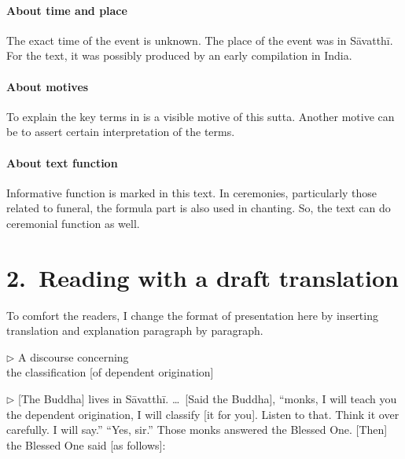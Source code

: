 \paragraph*{About time and place} The exact time of the event is unknown. The place of the event was in S\=avatth\=i. For the text, it was possibly produced by an early compilation in India.

\paragraph*{About motives} To explain the key terms in  is a visible motive of this sutta. Another motive can be to assert certain interpretation of the terms.

\paragraph*{About text function} Informative function is marked in this text. In ceremonies, particularly those related to funeral, the formula part is also used in chanting. So, the text can do ceremonial function as well.

{}
\section*{2.\ Reading with a draft translation}

To comfort the readers, I change the format of presentation here by inserting translation and explanation paragraph by paragraph.

\bigskip
\begin{center}
\textbf{}\par
$\triangleright$ A discourse concerning\\the classification [of dependent origination]
\end{center}

\setcounter{sennum}{0}

\addtocounter{sennum}{-2}
$\triangleright$  [The Buddha] lives in S\=avatth\=i. \ldots\ [Said the Buddha], ``monks, I will teach you the dependent origination, I will classify [it for you]. Listen to that. Think it over carefully. I will say.''  ``Yes, sir.'' Those monks answered the Blessed One. [Then] the Blessed One said [as follows]:

